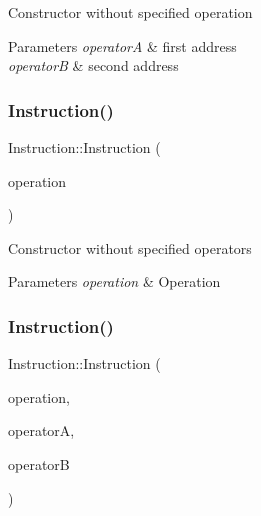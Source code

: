 Constructor without specified operation 
\begin{DoxyParams}{Parameters}
{\em operatorA} & first address \\
\hline
{\em operatorB} & second address \\
\hline
\end{DoxyParams}
\mbox{\label{classInstruction_ad1758d4d7afbf358e529e1ce5b199890}} 
\subsubsection{\texorpdfstring{Instruction()}{Instruction()}\hspace{0.1cm}{\footnotesize\ttfamily [2/3]}}
{\footnotesize\ttfamily Instruction\+::\+Instruction (\begin{DoxyParamCaption}\item[{const std\+::shared\+\_\+ptr$<$ \hyperlink{classMarsOperation}{Mars\+Operation} $>$}]{operation }\end{DoxyParamCaption})}

Constructor without specified operators 
\begin{DoxyParams}{Parameters}
{\em operation} & Operation \\
\hline
\end{DoxyParams}
\mbox{\label{classInstruction_a89efff676fc87ab4f831f4e7f4d574b9}} 
\subsubsection{\texorpdfstring{Instruction()}{Instruction()}\hspace{0.1cm}{\footnotesize\ttfamily [3/3]}}
{\footnotesize\ttfamily Instruction\+::\+Instruction (\begin{DoxyParamCaption}\item[{const std\+::shared\+\_\+ptr$<$ \hyperlink{classMarsOperation}{Mars\+Operation} $>$}]{operation,  }\item[{const std\+::shared\+\_\+ptr$<$ \hyperlink{classInstructionModifier}{Instruction\+Modifier} $>$}]{operatorA,  }\item[{const std\+::shared\+\_\+ptr$<$ \hyperlink{classInstructionModifier}{Instruction\+Modifier} $>$}]{operatorB }\end{DoxyParamCaption})}

